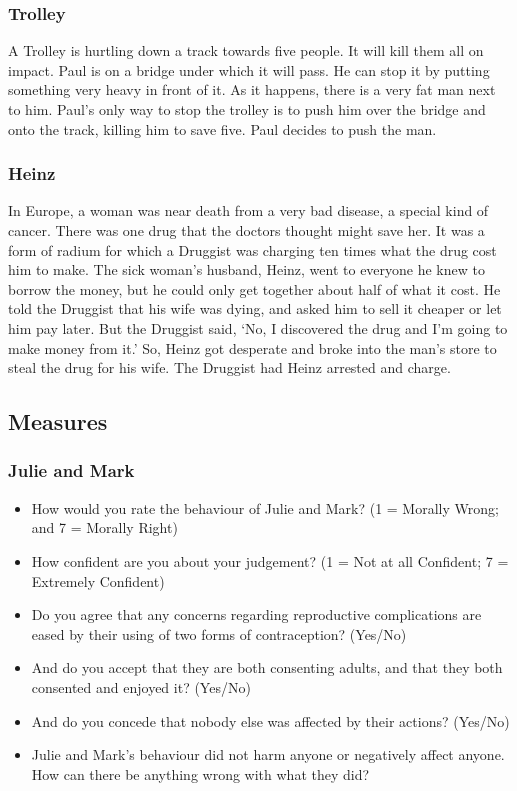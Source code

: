 \documentclass[
  man,floatsintext]{apa6}
\providecommand{\tightlist}{%
  \setlength{\itemsep}{0pt}\setlength{\parskip}{0pt}}
\begin{document}
\hypertarget{trolley}{%
\subsubsection{Trolley}\label{trolley}}

A Trolley is hurtling down a track towards five people. It will kill them all on impact. Paul is on a bridge under which it will pass. He can stop it by putting something very heavy in front of it. As it happens, there is a very fat man next to him. Paul's only way to stop the trolley is to push him over the bridge and onto the track, killing him to save five. Paul decides to push the man.

\hypertarget{heinz}{%
\subsubsection{Heinz}\label{heinz}}

In Europe, a woman was near death from a very bad disease, a special kind of cancer. There was one drug that the doctors thought might save her. It was a form of radium for which a Druggist was charging ten times what the drug cost him to make. The sick woman's husband, Heinz, went to everyone he knew to borrow the money, but he could only get together about half of what it cost. He told the Druggist that his wife was dying, and asked him to sell it cheaper or let him pay later. But the Druggist said, `No, I discovered the drug and I'm going to make money from it.' So, Heinz got desperate and broke into the man's store to steal the drug for his wife. The Druggist had Heinz arrested and charge.

\hypertarget{measures}{%
\subsection{Measures}\label{measures}}

\hypertarget{julie-and-mark-1}{%
\subsubsection{Julie and Mark}\label{julie-and-mark-1}}

\begin{itemize}
\tightlist
\item
  How would you rate the behaviour of Julie and Mark? (1 = Morally Wrong; and 7 = Morally Right)
\item
  How confident are you about your judgement? (1 = Not at all Confident; 7 = Extremely Confident)
\item
  Do you agree that any concerns regarding reproductive complications are eased by their using of two forms of contraception? (Yes/No)
\item
  And do you accept that they are both consenting adults, and that they both consented and enjoyed it? (Yes/No)
\item
  And do you concede that nobody else was affected by their actions? (Yes/No)
\item
  Julie and Mark's behaviour did not harm anyone or negatively affect anyone. How can there be anything wrong with what they did?
\end{itemize}
\end{document}
